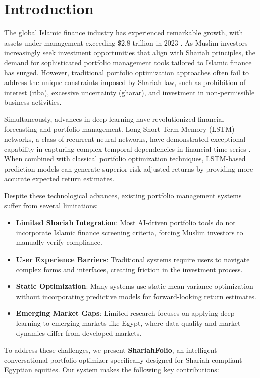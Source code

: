 \documentclass[conference]{IEEEtran}
\begin{document}
\section{Introduction}

The global Islamic finance industry has experienced remarkable growth, with assets under management exceeding \$2.8 trillion in 2023 \cite{islamic_finance_2023}. As Muslim investors increasingly seek investment opportunities that align with Shariah principles, the demand for sophisticated portfolio management tools tailored to Islamic finance has surged. However, traditional portfolio optimization approaches often fail to address the unique constraints imposed by Shariah law, such as prohibition of interest (riba), excessive uncertainty (gharar), and investment in non-permissible business activities.

Simultaneously, advances in deep learning have revolutionized financial forecasting and portfolio management. Long Short-Term Memory (LSTM) networks, a class of recurrent neural networks, have demonstrated exceptional capability in capturing complex temporal dependencies in financial time series \cite{lstm_portfolio_2024}. When combined with classical portfolio optimization techniques, LSTM-based prediction models can generate superior risk-adjusted returns by providing more accurate expected return estimates.

Despite these technological advances, existing portfolio management systems suffer from several limitations:
\begin{itemize}
\item \textbf{Limited Shariah Integration}: Most AI-driven portfolio tools do not incorporate Islamic finance screening criteria, forcing Muslim investors to manually verify compliance.
\item \textbf{User Experience Barriers}: Traditional systems require users to navigate complex forms and interfaces, creating friction in the investment process.
\item \textbf{Static Optimization}: Many systems use static mean-variance optimization without incorporating predictive models for forward-looking return estimates.
\item \textbf{Emerging Market Gaps}: Limited research focuses on applying deep learning to emerging markets like Egypt, where data quality and market dynamics differ from developed markets.
\end{itemize}

To address these challenges, we present \textbf{ShariahFolio}, an intelligent conversational portfolio optimizer specifically designed for Shariah-compliant Egyptian equities. Our system makes the following key contributions:
\end{document}
